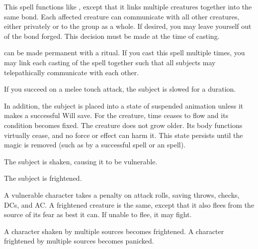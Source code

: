 \begin{spelleffect}
  This spell functions like , except that it links multiple creatures together into the same bond. Each affected creature can communicate with all other creatures, either privately or to the group as a whole. If desired, you may leave yourself out of the bond forged. This decision must be made at the time of casting.
\end{spelleffect}
\begin{spellnotes}
   can be made permanent with a  ritual. If you cast this spell multiple times, you may link each casting of the spell together such that all subjects may telepathically communicate with each other. 
\end{spellnotes}

\begin{spelleffect}
  If you succeed on a melee touch attack, the subject is slowed for a \durshort duration.
\end{spelleffect}
\begin{spellblood}
  In addition, the subject is placed into a state of suspended animation unless it makes a successful Will save. For the creature, time ceases to flow and its condition becomes fixed. The creature does not grow older. Its body functions virtually cease, and no force or effect can harm it. This state persists until the magic is removed (such as by a successful  spell or an  spell).
\end{spellblood}

\spellrng{\rngclose}
\spelldur{\durshort}
\begin{spellhealthy}
  The subject is shaken, causing it to be vulnerable.
\end{spellhealthy}
\begin{spellblood}
  The subject is frightened.
\end{spellblood}
\begin{spellnotes}
  A vulnerable character takes a  penalty on attack rolls, saving throws, checks, DCs, and AC. A frightened creature is the same, except that it also flees from the source of its fear as best it can. If unable to flee, it may fight.
  \par A character shaken by multiple sources becomes frightened. A character frightened by multiple sources becomes panicked.
\end{spellnotes}

